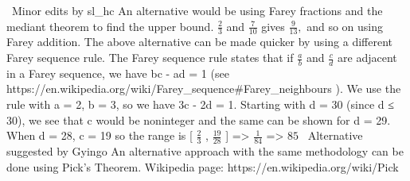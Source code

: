 \documentclass[12pt]{article}
\begin{document}
~Minor edits by sl_hc An alternative would be using Farey fractions and the mediant theorem to find the upper bound. $\frac{2}{3}$ and $\frac{7}{10}$ gives $\frac{9}{13},$ and so on using Farey addition. The above alternative can be made quicker by using a different Farey sequence rule. The Farey sequence rule states that if $\frac{a}{b}$ and $\frac{c}{d}$ are adjacent in a Farey sequence, we have bc - ad = 1 (see https://en.wikipedia.org/wiki/Farey_sequence#Farey_neighbours ). We use the rule with a = 2, b = 3, so we have 3c - 2d = 1. Starting with d = 30 (since d ≤ 30), we see that c would be noninteger and the same can be shown for d = 29. When d = 28, c = 19 so the range is [ $\frac{2}{3}$ , $\frac{19}{28}$ ] => $\frac{1}{84}$ => $\boxed{85}$ ~Alternative suggested by Gyingo An alternative approach with the same methodology can be done using Pick's Theorem. Wikipedia page: https://en.wikipedia.org/wiki/Pick%
\end{document}
